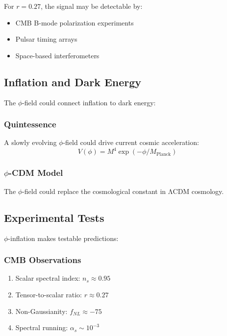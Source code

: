 For $r = 0.27$, the signal may be detectable by:
\begin{itemize}
\item CMB B-mode polarization experiments
\item Pulsar timing arrays
\item Space-based interferometers
\end{itemize}

\subsection{Inflation and Dark Energy}

The $\phi$-field could connect inflation to dark energy:

\subsubsection{Quintessence}

A slowly evolving $\phi$-field could drive current cosmic acceleration:
\begin{equation}
V(\phi) = M^4 \exp(-\phi/M_{\text{Planck}})
\end{equation}

\subsubsection{$\phi$-CDM Model}

The $\phi$-field could replace the cosmological constant in ΛCDM cosmology.

\subsection{Experimental Tests}

$\phi$-inflation makes testable predictions:

\subsubsection{CMB Observations}

\begin{enumerate}
\item Scalar spectral index: $n_s \approx 0.95$
\item Tensor-to-scalar ratio: $r \approx 0.27$
\item Non-Gaussianity: $f_{NL} \approx -75$
\item Spectral running: $\alpha_s \sim 10^{-3}$
\end{enumerate}

